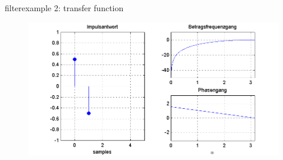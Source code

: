 	\begin{frame}{filter}{example 2: transfer function}
		\begin{figure}
			\centerline{\includegraphics[scale=.5]{graph/fx_02}}
		\end{figure}
	\end{frame}	
	
